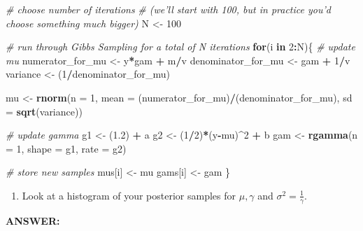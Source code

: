 \documentclass[
]{article}
\newenvironment{Shaded}{\begin{snugshade}}{\end{snugshade}}
\newcommand{\CommentTok}[1]{\textcolor[rgb]{0.56,0.35,0.01}{\textit{#1}}}
\newcommand{\ControlFlowTok}[1]{\textcolor[rgb]{0.13,0.29,0.53}{\textbf{#1}}}
\newcommand{\DataTypeTok}[1]{\textcolor[rgb]{0.13,0.29,0.53}{#1}}
\newcommand{\DecValTok}[1]{\textcolor[rgb]{0.00,0.00,0.81}{#1}}
\newcommand{\FloatTok}[1]{\textcolor[rgb]{0.00,0.00,0.81}{#1}}
\newcommand{\KeywordTok}[1]{\textcolor[rgb]{0.13,0.29,0.53}{\textbf{#1}}}
\newcommand{\NormalTok}[1]{#1}
\newcommand{\OperatorTok}[1]{\textcolor[rgb]{0.81,0.36,0.00}{\textbf{#1}}}
\newcommand{\StringTok}[1]{\textcolor[rgb]{0.31,0.60,0.02}{#1}}
\providecommand{\tightlist}{%
  \setlength{\itemsep}{0pt}\setlength{\parskip}{0pt}}
\begin{document}
\begin{Shaded}
\begin{Highlighting}[]
\CommentTok{# choose number of iterations}
\CommentTok{# (we'll start with 100, but in practice you'd choose something much bigger)}
\NormalTok{N <-}\StringTok{  }\DecValTok{100}

\CommentTok{# run through Gibbs Sampling for a total of N iterations}
\ControlFlowTok{for}\NormalTok{(i }\ControlFlowTok{in} \DecValTok{2}\OperatorTok{:}\NormalTok{N)\{}
  \CommentTok{# update mu}
\NormalTok{  numerator_for_mu <-}\StringTok{ }\NormalTok{y}\OperatorTok{*}\NormalTok{gam }\OperatorTok{+}\StringTok{ }\NormalTok{m}\OperatorTok{/}\NormalTok{v}
\NormalTok{  denominator_for_mu <-}\StringTok{ }\NormalTok{gam }\OperatorTok{+}\StringTok{ }\DecValTok{1}\OperatorTok{/}\NormalTok{v}
\NormalTok{  variance <-}\StringTok{ }\NormalTok{(}\DecValTok{1}\OperatorTok{/}\NormalTok{denominator_for_mu)}

\NormalTok{  mu <-}\StringTok{ }\KeywordTok{rnorm}\NormalTok{(}\DataTypeTok{n =} \DecValTok{1}\NormalTok{, }\DataTypeTok{mean =}\NormalTok{ (numerator_for_mu)}\OperatorTok{/}\NormalTok{(denominator_for_mu), }\DataTypeTok{sd =} \KeywordTok{sqrt}\NormalTok{(variance))}

  \CommentTok{# update gamma}
\NormalTok{  g1 <-}\StringTok{ }\NormalTok{(}\FloatTok{1.2}\NormalTok{) }\OperatorTok{+}\StringTok{ }\NormalTok{a}
\NormalTok{  g2 <-}\StringTok{ }\NormalTok{(}\DecValTok{1}\OperatorTok{/}\DecValTok{2}\NormalTok{)}\OperatorTok{*}\NormalTok{(y}\OperatorTok{-}\NormalTok{mu)}\OperatorTok{^}\DecValTok{2} \OperatorTok{+}\StringTok{ }\NormalTok{b}
\NormalTok{  gam <-}\StringTok{ }\KeywordTok{rgamma}\NormalTok{(}\DataTypeTok{n =} \DecValTok{1}\NormalTok{, }\DataTypeTok{shape =}\NormalTok{ g1, }\DataTypeTok{rate =}\NormalTok{ g2)}

  \CommentTok{# store new samples}
\NormalTok{  mus[i] <-}\StringTok{ }\NormalTok{mu}
\NormalTok{  gams[i] <-}\StringTok{ }\NormalTok{gam}
\NormalTok{\}}
\end{Highlighting}
\end{Shaded}

\begin{enumerate}
\def\labelenumi{\arabic{enumi}.}
\setcounter{enumi}{4}
\tightlist
\item
  Look at a histogram of your posterior samples for \(\mu, \gamma\) and
  \(\sigma^2 = \frac{1}{\gamma}\).
\end{enumerate}

\textbf{ANSWER:}
\end{document}
